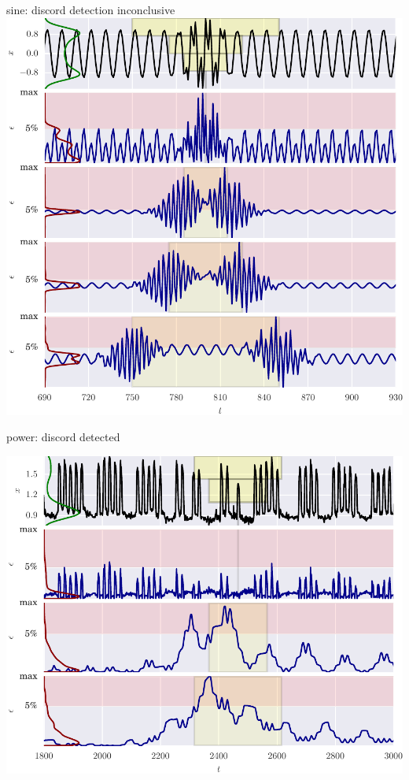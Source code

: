 \documentclass{beamer}
\begin{document}
    \begin{frame}{sine: discord detection inconclusive}
      \centering
      \includegraphics[height=\textheight]{figs/er_sin.pdf}

    \end{frame}


    \begin{frame}{power: discord detected}

      \includegraphics[width=\textwidth]{figs/er_power.pdf}

    \end{frame}
\end{document}
